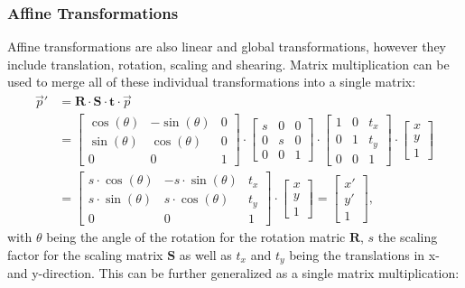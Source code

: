 \subsubsection{Affine Transformations}
Affine transformations are also linear and global transformations, however they include translation, rotation, scaling and shearing. Matrix multiplication can be used to merge all of these individual transformations into a single matrix:
\begin{align}
	\overrightarrow{p}' 	&= \mathbf{R} \cdot \mathbf{S} \cdot \mathbf{t} \cdot  \overrightarrow{p}	\\
	&= 
	\begin{bmatrix}
		\cos(\theta) & -\sin(\theta) & 0\\
		\sin(\theta) & \cos(\theta) & 0\\
		0 & 0 & 1
	\end{bmatrix}
	\cdot 
	\begin{bmatrix}
		s & 0 & 0\\
		0 & s & 0\\
		0 & 0 & 1
	\end{bmatrix}
	\cdot 
	\begin{bmatrix}
		1 & 0 & t_x\\
		0 & 1 & t_y\\
		0 & 0 & 1
	\end{bmatrix}
	\cdot
	\begin{bmatrix}
		x\\
		y\\
		1
	\end{bmatrix}
	\\
	&=
	\begin{bmatrix}
		s \cdot \cos(\theta) & -s \cdot \sin(\theta) & t_x\\
		s \cdot \sin(\theta) & s \cdot \cos(\theta) & t_y\\
		0 & 0 & 1
	\end{bmatrix}
	\cdot
	\begin{bmatrix}
		x\\
		y\\
		1
	\end{bmatrix} =
	\begin{bmatrix}
		x'\\
		y'\\
		1
	\end{bmatrix} ,
\end{align}
with $\theta$ being the angle of the rotation for the rotation matric $\mathbf{R}$, $s$ the scaling factor for the scaling matrix $\mathbf{S}$ as well as $t_x$ and $t_y$ being the translations in x- and y-direction. This can be further generalized as a single matrix multiplication:
